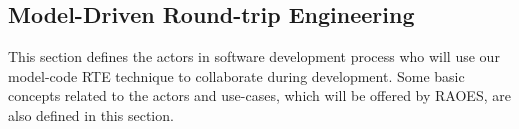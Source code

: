 \subsection{Model-Driven Round-trip Engineering}
\label{subsec:mdrtebackground}

This section defines the actors in software development process who will use our model-code RTE technique to collaborate during development.
Some basic concepts related to the actors and use-cases, which will be offered by RAOES, are also defined in this section.







\begin{comment}

\begin{definition}[Baseline artifact]
	A baseline artifact is one which may be edited manually.
	All other artifacts are produced from the baseline artifact
	through some process, and only through a process. Manual edition
	of artifacts other than the baseline artifact is forbidden.
\end{definition}
\end{comment}

